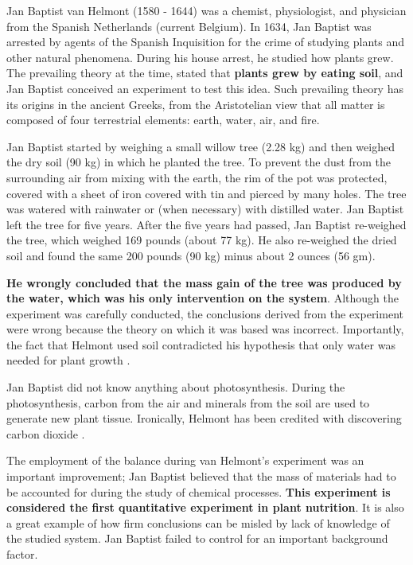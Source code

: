 \documentclass[
  12pt,
]{book}
\begin{document}
Jan Baptist van Helmont (1580 - 1644) was a chemist, physiologist, and physician from the Spanish Netherlands (current Belgium). In 1634, Jan Baptist was arrested by agents of the Spanish Inquisition for the crime of studying plants and other natural phenomena. During his house arrest, he studied how plants grew. The prevailing theory at the time, stated that \textbf{plants grew by eating soil}, and Jan Baptist conceived an experiment to test this idea. Such prevailing theory has its origins in the ancient Greeks, from the Aristotelian view that all matter is composed of four terrestrial elements: earth, water, air, and fire.

Jan Baptist started by weighing a small willow tree (2.28 kg) and then weighed the dry soil (90 kg) in which he planted the tree. To prevent the dust from the surrounding air from mixing with the earth, the rim of the pot was protected, covered with a sheet of iron covered with tin and pierced by many holes. The tree was watered with rainwater or (when necessary) with distilled water. Jan Baptist left the tree for five years. After the five years had passed, Jan Baptist re-weighed the tree, which weighed 169 pounds (about 77 kg). He also re-weighed the dried soil and found the same 200 pounds (90 kg) minus about 2 ounces (56 gm).

\textbf{He wrongly concluded that the mass gain of the tree was produced by the water, which was his only intervention on the system}. Although the experiment was carefully conducted, the conclusions derived from the experiment were wrong because the theory on which it was based was incorrect. Importantly, the fact that Helmont used soil contradicted his hypothesis that only water was needed for plant growth \citep{hershey1991digging}.

Jan Baptist did not know anything about photosynthesis. During the photosynthesis, carbon from the air and minerals from the soil are used to generate new plant tissue. Ironically, Helmont has been credited with discovering carbon dioxide \citep{hershey1991digging}.

The employment of the balance during van Helmont's experiment was an important improvement; Jan Baptist believed that the mass of materials had to be accounted for during the study of chemical processes. \textbf{This experiment is considered the first quantitative experiment in plant nutrition}. It is also a great example of how firm conclusions can be misled by lack of knowledge of the studied system. Jan Baptist failed to control for an important background factor.
\end{document}
